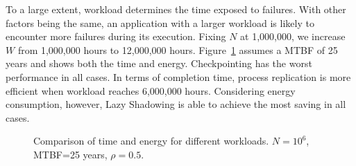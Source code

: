 To a large extent, workload determines the time exposed to failures. With other factors being the same, an application with a larger workload is likely to encounter more failures during its execution. %
Fixing $N$ at 1,000,000, we increase $W$ from 1,000,000 hours to 12,000,000 hours. Figure~\ref{fig:w25} assumes a MTBF of 25 years and shows both the time and energy. Checkpointing has the worst performance in all cases. In terms of completion time, process replication is more efficient when workload reaches 6,000,000 hours. Considering energy consumption, however, Lazy Shadowing is able to achieve the most saving in all cases. %

\begin{figure}[!t]
	\captionsetup{justification=centering}
	\begin{center}
	\end{center}
	\vskip -0.04in 
	\caption{Comparison of time and energy for different workloads. $N=10^6$, MTBF=25 years, $\rho=0.5$.}
	\label{fig:w25}
\end{figure}
